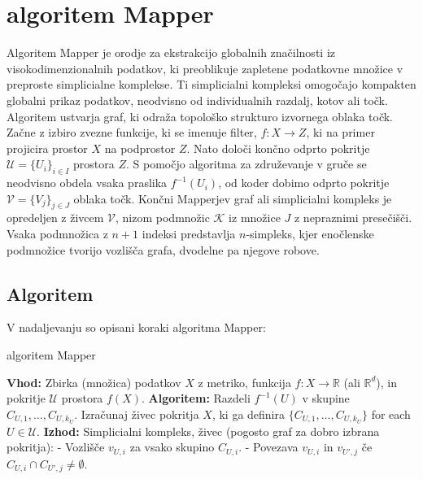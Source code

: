 \chapter{algoritem Mapper}
Algoritem Mapper je orodje za ekstrakcijo globalnih značilnosti iz visokodimenzionalnih podatkov, ki preoblikuje zapletene podatkovne množice v preproste simplicialne komplekse. Ti simplicialni kompleksi omogočajo kompakten globalni prikaz podatkov, neodvisno od individualnih razdalj, kotov ali točk.
Algoritem ustvarja graf, ki odraža topološko strukturo izvornega oblaka točk. Začne z izbiro zvezne funkcije, ki se imenuje filter, $f : X \rightarrow Z$, ki na primer projicira prostor $X$ na podprostor $Z$. Nato določi končno odprto pokritje $\mathcal{U} = \{U_i\}_{i \in I}$ prostora $Z$. S pomočjo algoritma za združevanje v gruče se neodvisno obdela vsaka praslika $f^{-1}(U_i)$, od koder dobimo odprto pokritje $\mathcal{V} = \{V_j\}_{j \in J}$ oblaka točk. Končni Mapperjev graf ali simplicialni kompleks je opredeljen z živcem $\mathcal{V}$, nizom podmnožic $\mathcal{K}$ iz množice $J$ z nepraznimi presečišči. Vsaka podmnožica z $n+1$ indeksi predstavlja $n$-simpleks, kjer enočlenske podmnožice tvorijo vozlišča grafa, dvodelne pa njegove robove.
\begin{comment}
https://danedmiston.github.io/home_page/assets/Mapper.pdf
\end{comment}

\cite{Langenbahn2022}
\section{Algoritem}
V nadaljevanju so opisani koraki algoritma Mapper:
\begin{algorithm}
  \caption{algoritem Mapper}\label{alg:cap}
  \begin{algorithmic}
    \State \textbf{Vhod:} Zbirka (množica) podatkov $X$ z metriko, funkcija $f: X \rightarrow \mathbb{R}$ (ali $\mathbb{R}^d$), in pokritje $\mathcal{U}$ prostora $f(X)$.
    \State \textbf{Algoritem:}
    \State Razdeli $f^{-1}(U)$  v skupine $C_{U,1}, \ldots, C_{U,k_U}$.
    \State Izračunaj živec pokritja $X$, ki ga definira $\{C_{U,1}, \ldots, C_{U,k_U}\}$ for each $U \in \mathcal{U}$.
    \EndFor
    \State \textbf{Izhod:} Simplicialni kompleks, živec (pogosto graf za dobro izbrana pokritja):
    \State \quad - Vozlišče $v_{U,i}$ za vsako skupino $C_{U,i}$.
    \State \quad - Povezava $v_{U,i}$ in $v_{U',j}$ če $C_{U,i} \cap C_{U',j} \neq \emptyset$.
  \end{algorithmic}
\end{algorithm}